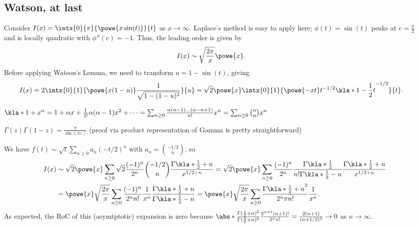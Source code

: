 \documentclass[english, parskip=full]{scrartcl}
\newcommand{\definition}[2]{\begin{tcolorbox}[colback=colorbackgrounddefinition,colframe=colordefinition, breakable,enhanced,title=\textbf{#1}.]#2\end{tcolorbox}}
\newcommand{\note}[1]{\begin{tcolorbox}[colback=colorbackgroundnote,colframe=colornote, breakable,enhanced]#1\end{tcolorbox}}
\begin{document}
\subsection{Watson, at last}
Consider $I(x) = \intx{0}{\pi}{\powe{x\sin(t)}}{t}$ as $x\rightarrow\infty$.
Laplace's method is easy to apply here; $\phi(t)=\sin(t)$ peaks at $c=\frac{\pi}{2}$ and is locally quadratic with $\phi''(c) = -1$.
Thus, the leading order is given by 
\begin{align}
I(x) &\sim \sqrt{\frac{2\pi}{x}} \powe{x}.
\end{align}
Before applying Watson's Lemma, we need to transform $u=1-\sin(t)$, giving
\begin{align}
I(x) &= 2 \intx{0}{1}{\powe{x(1-u)} \frac{1}{\sqrt{1 - (1-u)^2}} }{u} = \sqrt{2} \powe{x} \intx{0}{1}{\powe{-xt} t^{-1/2} \kla*{1 - \frac{1}{2}t}^{-1/2}}{t}.
\end{align}
\note{$\kla*{1 + x}^\alpha = 1 + \alpha x + \frac{1}{2!} \alpha (\alpha-1) x^2 + \dots = \sum_{n\ge 0} \frac{\alpha (\alpha-1) \dots (\alpha - n + 1)}{n!} x^n = \sum_{n\ge 0} \binom{\alpha}{n} x^n $}
\definition{Euler's Reflection Identity}{$\Gamma(z) \Gamma(1-z) = \frac{\pi}{\sin(\pi z)}$ (proof via product representation of Gamma is pretty straightforward)}
We have $f(t) \sim \sqrt{t} \sum_{n\ge 0} a_n (-t/2)^n$ with $a_n = \binom{-1/2}{n}$, so
\begin{align}
I(x) &\sim \sqrt{2}\powe{x} \sum_{n\ge 0} \sqrt{2} \frac{(-1)^n}{2^n} \binom{-1/2}{n} \frac{\Gamma\kla*{\frac{1}{2} + n}}{x^{1/2 + n}} = \sqrt{2}\powe{x} \sum_{n\ge 0} \frac{(-1)^n}{2^n} \frac{\Gamma\kla*{\frac{1}{2}}}{n! \Gamma\kla*{\frac{1}{2}-n}} \frac{\Gamma\kla*{\frac{1}{2} + n}}{x^{1/2 + n}}\\
&= \powe{x} \sqrt{\frac{2\pi}{x}} \sum_{n\ge 0} \frac{(-1)^n}{2^n n!} \frac{1}{x^n} \frac{\Gamma\kla*{\frac{1}{2} + n}}{\Gamma\kla*{\frac{1}{2} - n}} = \powe{x} \sqrt{\frac{2\pi}{x}} \sum_{n\ge 0} \frac{\Gamma\kla*{\frac{1}{2} + n}^2}{2^n \pi n!} \frac{1}{x^n}.
\end{align}
As expected, the RoC of this (asymtptotic) expansion is zero because $\abs*{\frac{\Gamma(\frac{1}{2}+n)^2}{\Gamma(\frac{3}{2}+n)^2} \frac{2^{n+1}(n+1)!}{2^n n!}} = \frac{2(n+1)}{(n+1/2)^2} \rightarrow 0$ as $n\rightarrow \infty$.
\end{document}

